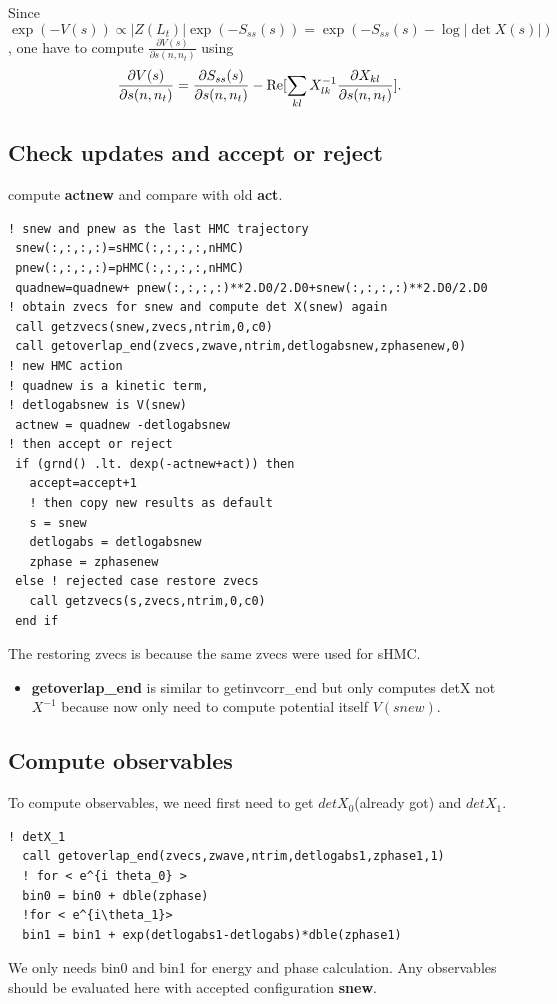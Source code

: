 \documentclass[10pt]{book}
\newcommand{\del}{\partial}
\begin{document}
Since 
$$ \exp(-V(s))\propto |Z(L_t)|\exp(-S_{ss}(s))=\exp(-S_{ss}(s)-\log|\det X(s)|)$$,
one have to compute $\frac{\del V(s)}{\del s(n,n_t)}$ using 
$$
\frac{\del V(s)}{\del s(n,n_t)}=\frac{\del S_{ss}(s)}{\del s(n,n_t)}-{\rm Re}[\sum_{kl} X^{-1}_{lk}
    \frac{\del X_{kl}}{\del s(n,n_t)}].
$$


\subsection{Check updates and accept or reject}
compute {\bf actnew} and compare with old {\bf act}.
\begin{lstlisting}[frame=single]
! snew and pnew as the last HMC trajectory
 snew(:,:,:,:)=sHMC(:,:,:,:,nHMC)
 pnew(:,:,:,:)=pHMC(:,:,:,:,nHMC)
 quadnew=quadnew+ pnew(:,:,:,:)**2.D0/2.D0+snew(:,:,:,:)**2.D0/2.D0
! obtain zvecs for snew and compute det X(snew) again
 call getzvecs(snew,zvecs,ntrim,0,c0)
 call getoverlap_end(zvecs,zwave,ntrim,detlogabsnew,zphasenew,0)
! new HMC action 
! quadnew is a kinetic term,
! detlogabsnew is V(snew)
 actnew = quadnew -detlogabsnew
! then accept or reject
 if (grnd() .lt. dexp(-actnew+act)) then
   accept=accept+1
   ! then copy new results as default
   s = snew
   detlogabs = detlogabsnew
   zphase = zphasenew
 else ! rejected case restore zvecs
   call getzvecs(s,zvecs,ntrim,0,c0)
 end if    
\end{lstlisting}
The restoring zvecs is because the same zvecs were used for sHMC.
\begin{itemize}
\item {\bf getoverlap\_end}  is similar to getinvcorr\_end but only computes detX not $X^{-1}$ because
    now only need to compute potential itself $V(snew)$.
\end{itemize}

\subsection{Compute observables} 
To compute observables, we need first need to get $detX_0$(already got) and $detX_1$.
\begin{lstlisting}[frame=single]
  ! detX_1
  call getoverlap_end(zvecs,zwave,ntrim,detlogabs1,zphase1,1) 
  ! for < e^{i theta_0} >
  bin0 = bin0 + dble(zphase)  
  !for < e^{i\theta_1}>
  bin1 = bin1 + exp(detlogabs1-detlogabs)*dble(zphase1) 
\end{lstlisting} 
We only needs bin0 and bin1 for energy and phase calculation. 
Any observables should be evaluated here with accepted configuration {\bf snew}.
\end{document}
